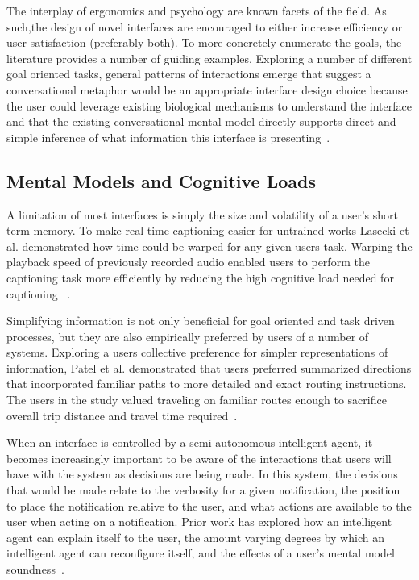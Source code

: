 The interplay of ergonomics and psychology are known facets of the field. As
such,the design of novel interfaces are encouraged to either increase
efficiency or user satisfaction (preferably both). To more concretely enumerate
the goals, the literature provides a number of guiding examples.  Exploring a
number of different goal oriented tasks, general patterns of interactions emerge
that suggest a conversational metaphor would be an appropriate interface design
choice because the user could leverage existing biological mechanisms to
understand the interface and that the existing conversational mental model
directly supports direct and simple inference of what information this
interface is presenting~\cite{kieras1984role}.

\subsection{                  Mental Models and Cognitive Loads              }

A limitation of most interfaces is simply the size and volatility of a user's
short term memory.  To make real time captioning easier for untrained works
Lasecki et al. demonstrated how time could be warped for any given users task.
Warping the playback speed of previously recorded audio enabled users to perform
the captioning task more efficiently by reducing the high cognitive load needed
for captioning ~\cite{lasecki2013warping}.

Simplifying information is not only beneficial for goal oriented and task driven
processes, but they are also empirically preferred by users of a number of
systems. Exploring a users collective preference for simpler  representations of
information, Patel et al. demonstrated that users preferred summarized
directions that incorporated familiar paths to more detailed and exact routing
instructions. The users in the study valued traveling on  familiar routes enough
to sacrifice overall trip distance and travel time
required~\cite{patel2006personalizing}.

When an interface is controlled by a semi-autonomous intelligent agent, it
becomes increasingly important to be aware of the interactions that users will
have with the system as decisions are being made.  In this system, the
decisions that would be made relate to the verbosity for a given notification,
the position to place the notification relative to the user, and what actions
are available to the user when acting on a notification.  Prior work has
explored how an intelligent agent can explain itself to the user, the amount
varying degrees by which an intelligent agent can reconfigure itself, and the
effects of a user's mental model soundness~\cite{kulesza2012tell}.

